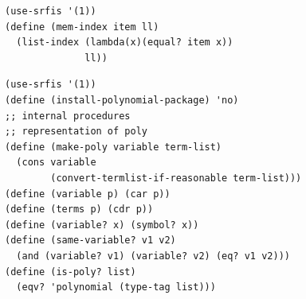 \documentclass[final,fleqn,titlepage,twoside]{article}
\begin{document}
\begin{verbatim}
(use-srfis '(1))
(define (mem-index item ll)
  (list-index (lambda(x)(equal? item x))
              ll))
\end{verbatim}
\begin{verbatim}
(use-srfis '(1))
(define (install-polynomial-package) 'no)
;; internal procedures
;; representation of poly
(define (make-poly variable term-list)
  (cons variable
        (convert-termlist-if-reasonable term-list)))
(define (variable p) (car p))
(define (terms p) (cdr p))
(define (variable? x) (symbol? x))
(define (same-variable? v1 v2)
  (and (variable? v1) (variable? v2) (eq? v1 v2)))
(define (is-poly? list)
  (eqv? 'polynomial (type-tag list)))


\end{verbatim}
\end{document}
